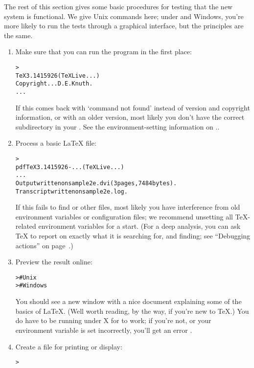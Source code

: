 \documentclass{article}
\begin{document}
The rest of this section gives some basic procedures for testing that
the new system is functional.  We give Unix commands here; under
\MacOSX{} and Windows, you're more likely to run the tests through a
graphical interface, but the principles are the same.

\begin{enumerate}

\item Make sure that you can run the  program in the first
place:
\begin{alltt}
> 
TeX 3.1415926 (TeX Live ...)
Copyright ... D.E. Knuth.
...
\end{alltt}
If this comes back with `command not found' instead of version and
copyright information, or with an older version, most likely you don't
have the correct  subdirectory in your .  See
the environment-setting information on \p.\pageref{sec:env}.

\item Process a basic \LaTeX{} file:
\begin{alltt}
> 
pdfTeX 3.1415926-... (TeX Live ...)
...
Output written on sample2e.dvi (3 pages, 7484 bytes).
Transcript written on sample2e.log.
\end{alltt}
If this fails to find  or other files, most
likely you have interference from old environment variables or
configuration files; we recommend unsetting all \TeX-related environment
variables for a start.  (For a deep analysis, you can ask \TeX{} to
report on exactly what it is searching for, and finding; see ``Debugging
actions'' on page~\pageref{sec:debugging}.)

\item Preview the result online:
\begin{alltt}
>     # Unix
>   # Windows
\end{alltt}
You should see a new window with a nice document explaining some of the
basics of \LaTeX{}.  (Well worth reading, by the way, if you're new to
\TeX.)  You do have to be running under X for  to work; if
you're not, or your  environment variable is set
incorrectly, you'll get an error .

\item Create a \PS{} file for printing or display:
\begin{alltt}
> 
\end{alltt}


\end{enumerate}
\end{document}
